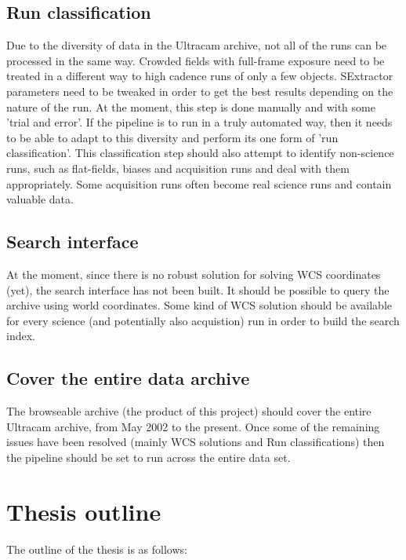 \documentclass[a4paper,10pt]{article}
\begin{document}
\subsection{Run classification}
Due to the diversity of data in the Ultracam archive, not all of the runs can be processed in the same way. Crowded fields with full-frame exposure need to be treated in a different way to high cadence runs of only a few objects. SExtractor parameters need to be tweaked in order to get the best results depending on the nature of the run. At the moment, this step is done manually and with some 'trial and error'. If the pipeline is to run in a truly automated way, then it needs to be able to adapt to this diversity and perform its one form of 'run classification'. This classification step should also attempt to identify non-science runs, such as flat-fields, biases and acquisition runs and deal with them appropriately. Some acquisition runs often become real science runs and contain valuable data. 

\subsection{Search interface}
At the moment, since there is no robust solution for solving WCS coordinates (yet), the search interface has not been built. It should be possible to query the archive using world coordinates. Some kind of WCS solution should be available for every science (and potentially also acquistion) run in order to build the search index.

\subsection{Cover the entire data archive} 
The browseable archive (the product of this project) should cover the entire Ultracam archive, from May 2002 to the present. Once some of the remaining issues have been resolved (mainly WCS solutions and Run classifications) then the pipeline should be set to run across the entire data set. 

\section{Thesis outline}

The outline of the thesis is as follows:
\end{document}
